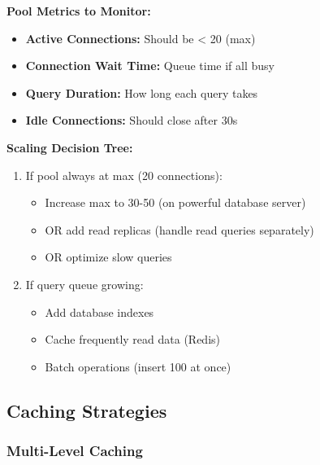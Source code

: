 \documentclass[12pt,a4paper,oneside]{article}
\begin{document}
\textbf{Pool Metrics to Monitor:}

\begin{itemize}
    \item \textbf{Active Connections:} Should be < 20 (max)
    \item \textbf{Connection Wait Time:} Queue time if all busy
    \item \textbf{Query Duration:} How long each query takes
    \item \textbf{Idle Connections:} Should close after 30s
\end{itemize}

\textbf{Scaling Decision Tree:}

\begin{enumerate}
    \item If pool always at max (20 connections):
    \begin{itemize}
        \item Increase max to 30-50 (on powerful database server)
        \item OR add read replicas (handle read queries separately)
        \item OR optimize slow queries
    \end{itemize}
    
    \item If query queue growing:
    \begin{itemize}
        \item Add database indexes
        \item Cache frequently read data (Redis)
        \item Batch operations (insert 100 at once)
    \end{itemize}
\end{enumerate}

\subsection{Caching Strategies}

\subsubsection{Multi-Level Caching}
\end{document}
